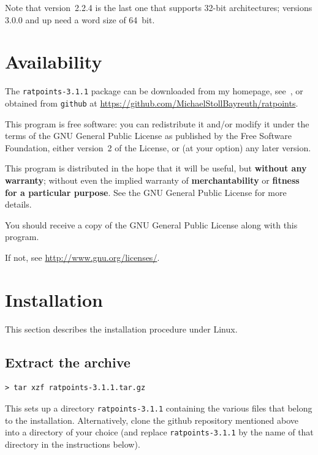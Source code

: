 \documentclass[12pt,a4paper,oneside]{amsart}
\newcommand{\rpversion}{3.1.1} %
\begin{document}
Note that version~2.2.4 is the last one that supports 32-bit architectures;
versions 3.0.0 and up need a word size of 64~bit.


\section{Availability}

The \texttt{ratpoints-\rpversion} package can be downloaded from my homepage,
see~\cite{ratpoints}, or obtained from \texttt{github} at
\url{https://github.com/MichaelStollBayreuth/ratpoints}.

This program is free software: you can redistribute it and/or modify
it under the terms of the GNU General Public License as published
by the Free Software Foundation, either version~2 of the License, or
(at your option) any later version.

This program is distributed in the hope that it will be useful,
but \textbf{without any warranty}; without even the implied warranty of
\textbf{merchantability} or \textbf{fitness for a particular purpose}. See the
GNU General Public License for more details.

You should receive a copy of the GNU General Public License
along with this program.

If not, see \url{http://www.gnu.org/licenses/}.


\section{Installation}

This section describes the installation procedure under Linux.

\subsection{Extract the archive}

\begin{verbatim}
> tar xzf ratpoints-3.1.1.tar.gz
\end{verbatim}

This sets up a directory \texttt{ratpoints-\rpversion} containing the various
files that belong to the installation. Alternatively, clone the github
repository mentioned above into a directory of your choice (and replace
\texttt{ratpoints-\rpversion} by the name of that directory in the instructions below).
\end{document}
